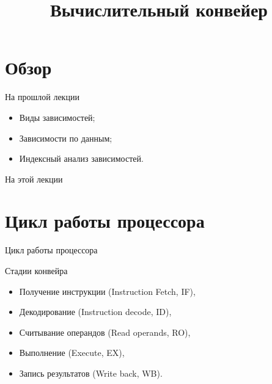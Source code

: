 

\title{Вычислительный конвейер}



\begin{frame}
\titlepage
\end{frame}

\section*{Обзор}

\begin{frame}{На прошлой лекции}
\begin{itemize}
\ifsbertech
    \item Виды зависимостей;
    \item Зависимости по данным;
    \item Индексный анализ зависимостей.
\fi
\end{itemize}
\end{frame}

\begin{frame}{На этой лекции}
\tableofcontents
\end{frame}

\section{Цикл работы процессора}

\begin{frame}{Цикл работы процессора}
\centering
{}
\end{frame}

\begin{frame}{Стадии конвейра}
\begin{itemize}
    \item Получение инструкции (Instruction Fetch, IF),
    \item Декодирование (Instruction decode, ID),
    \item Считывание операндов (Read operands, RO),
    \item Выполнение (Execute, EX),
    \item Запись результатов (Write back, WB).
\end{itemize}
\end{frame}

